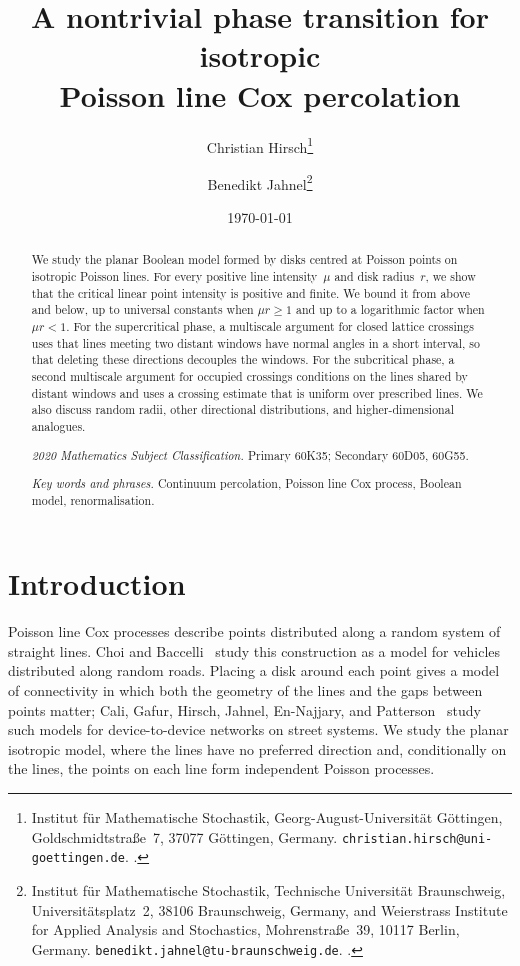 \documentclass[11pt,letterpaper]{article}
\title{\textbf{A nontrivial phase transition for isotropic\\ Poisson line Cox percolation}}
\author{%
  Christian Hirsch\thanks{Institut f\"ur Mathematische Stochastik, Georg-August-Universit\"at G\"ottingen, Goldschmidtstra\ss e~7, 37077 G\"ottingen, Germany. \texttt{christian.hirsch@uni-goettingen.de}. \orcid{0000-0003-4136-3740}.}
  \and
  Benedikt Jahnel\thanks{Institut f\"ur Mathematische Stochastik, Technische Universit\"at Braunschweig, Universit\"atsplatz~2, 38106 Braunschweig, Germany, and Weierstrass Institute for Applied Analysis and Stochastics, Mohrenstra\ss e~39, 10117 Berlin, Germany. \texttt{benedikt.jahnel@tu-braunschweig.de}. \orcid{0000-0002-4212-0065}.}%
}
\date{\today}
\begin{document}
\maketitle
\thispagestyle{plain}

\begin{abstract}
We study the planar Boolean model formed by disks centred at Poisson points on isotropic Poisson lines. For every positive line intensity~$\mu$ and disk radius~$r$, we show that the critical linear point intensity is positive and finite. We bound it from above and below, up to universal constants when $\mu r\ge1$ and up to a logarithmic factor when $\mu r<1$. For the supercritical phase, a multiscale argument for closed lattice crossings uses that lines meeting two distant windows have normal angles in a short interval, so that deleting these directions decouples the windows. For the subcritical phase, a second multiscale argument for occupied crossings conditions on the lines shared by distant windows and uses a crossing estimate that is uniform over prescribed lines. We also discuss random radii, other directional distributions, and higher-dimensional analogues.

\medskip
\noindent\textit{2020 Mathematics Subject Classification.} Primary 60K35; Secondary 60D05, 60G55.

\noindent\textit{Key words and phrases.} Continuum percolation, Poisson line Cox process, Boolean model, renormalisation.
\end{abstract}

\section{Introduction}
\label{sec:introduction}

Poisson line Cox processes describe points distributed along a random system of straight lines. Choi and Baccelli~\cite[Section~II]{ChBa18} study this construction as a model for vehicles distributed along random roads. Placing a disk around each point gives a model of connectivity in which both the geometry of the lines and the gaps between points matter; Cali, Gafur, Hirsch, Jahnel, En-Najjary, and Patterson~\cite{CGHJEP18} study such models for device-to-device networks on street systems. We study the planar isotropic model, where the lines have no preferred direction and, conditionally on the lines, the points on each line form independent Poisson processes.
\end{document}
